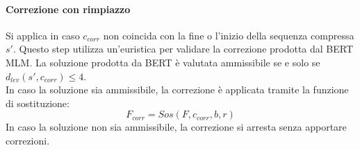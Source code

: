 \paragraph{Correzione con rimpiazzo}
Si applica in caso $c_{corr}$ non coincida con la fine o l'inizio della sequenza compressa $s\prime$. Questo step utilizza un'euristica per validare la correzione prodotta dal BERT MLM. La soluzione prodotta da BERT è valutata ammissibile se e solo se $d_{lev}(s\prime,c_{corr}) \leqslant 4$.\\
In caso la soluzione sia ammissibile, la correzione è applicata tramite la funzione di sostituzione:
\begin{equation}
F_{corr} = \textit{Sos}(F,c_{corr},b,r)
\end{equation}
In caso la soluzione non sia ammissibile, la correzione si arresta senza apportare correzioni.


















